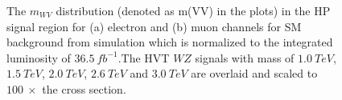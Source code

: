 \begin{figure}[h]
	\begin{center}
	\end{center}
	\caption{The $m_{WV}$ distribution (denoted as m(VV) in the plots) in the HP signal region for (a) electron and (b) muon channels for SM background from simulation which is normalized to the integrated luminosity of $36.5~fb^{-1}$.The HVT $WZ$ signals with mass of $1.0~TeV$, $1.5~TeV$, $2.0~TeV$, $2.6~TeV$ and $3.0~TeV$ are overlaid and
		scaled to $100 ~\times$ the cross section.}
	\label{Fig:HighPuritySR}
\end{figure}

